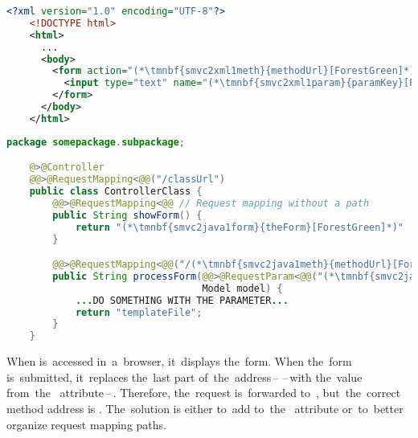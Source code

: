 \begin{lstlisting}[language=XML, title={Simple HTML form \tmnbf{smvc2xml1form}{\textit{theForm}}\textit{.html}}]
    <?xml version="1.0" encoding="UTF-8"?>
    <!DOCTYPE html>
    <html>
      ...
      <body>
        <form action="(*\tmnbf{smvc2xml1meth}{methodUrl}[ForestGreen]*)" method="post">
          <input type="text" name="(*\tmnbf{smvc2xml1param}{paramKey}[ForestGreen]*)">
        </form>
      </body>
    </html>
\end{lstlisting}
\begin{lstlisting}[language=Java, title={Controller class}]
    package somepackage.subpackage;

    @>@Controller
    @@>@RequestMapping<@@("/classUrl")
    public class ControllerClass {
        @@>@RequestMapping<@@ // Request mapping without a path
        public String showForm() {
            return "(*\tmnbf{smvc2java1form}{theForm}[ForestGreen]*)"
        }

        @@>@RequestMapping<@@("/(*\tmnbf{smvc2java1meth}{methodUrl}[ForestGreen]*)")
        public String processForm(@@>@RequestParam<@@("(*\tmnbf{smvc2java1param}{paramKey}[ForestGreen]*)") String singleParameter,
                                  Model model) {
            ...DO SOMETHING WITH THE PARAMETER...
            return "templateFile";
        }
    }
\end{lstlisting}

\noindent When  is~accessed in~a~browser, it~displays the~form.
When the~form is~submitted, it~replaces the~last part of~the~address\,--\,\,--\,with the~value from~the~ attribute\,--\,.
Therefore, the~request is~forwarded to~, but~the~correct method address is .
The~solution is either to~add  to~the~ attribute or~to~better organize request mapping paths.

